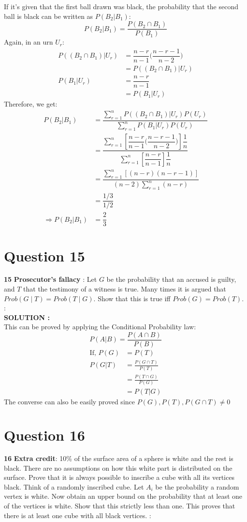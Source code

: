 \documentclass{article}
\begin{document}
If it's given that the first ball drawn was black, the probability that the second ball is black can be written as $P(B_2|B_1)$:
$$P(B_2|B_1) = \frac{P(B_2\cap B_1)}{P(B_1)}$$
Again, in an urn $U_r$:
\begin{align*}
P((B_2\cap B_1)|U_r)&=\dfrac{n-r}{n-1}\Big(\dfrac{n-r-1}{n-2}\Big)\\
&=P((B_2\cap B_1)|U_r)\\
P(B_1|U_r)&=\dfrac{n-r}{n-1}\\
&=P(B_1|U_r)
\end{align*}
Therefore, we get:
\begin{align*}
    P(B_2|B_1)&=\dfrac{\sum^n_{r=1}P((B_2\cap B_1)|U_r)P(U_r)}{\sum^n_{r=1}P(B_1|U_r)P(U_r)}\\
    &=\dfrac{\sum^n_{r=1}\left[\dfrac{n-r}{n-1}\Big(\dfrac{n-r-1}{n-2}\Big)\right]\dfrac{1}{n}}{\sum^n_{r=1}\left[\dfrac{n-r}{n-1}\right]\dfrac{1}{n}}\\
    &=\dfrac{\sum^n_{r=1}\left[(n-r)(n-r-1)\right]}{(n-2)\sum^n_{r=1}(n-r)}\\
    &=\dfrac{1/3}{1/2}\\
  \Rightarrow P(B_2|B_1)&=\dfrac{2}{3}
\end{align*}


\section{Question 15}
\label{Q15}
\textbf{15} \textbf{Prosecutor’s fallacy} : Let $G$ be the probability that an accused is guilty, and $T$ that the testimony of a witness is true. Many times it is argued that $Prob (G \mid T) = Prob (T \mid G)$. Show that this is true iff $Prob (G) = Prob (T).$ : \\ 

\hspace{1em} \large{\textbf{SOLUTION :}} \\
    This can be proved by applying the Conditional Probability law:
    $$P(A|B) = \frac{P(A\cap B)}{P(B)}$$
\begin{align*}
    \text{If, } P(G) &= P(T)\\
    P(G|T)&=\frac{P(G\cap T)}{P(T)}\\
    &=\frac{P(T\cap G)}{P(G)}\\
    &=P(T|G)
\end{align*}
The converse can also be easily proved since  $P(G),P(T),P(G\cap T)\neq0$
\section{Question 16}
\label{Q16}
\textbf{16} \textbf{Extra credit}: 10\% of the surface area of a sphere is white and the rest is black. There are no assumptions on how this white part is distributed on the surface. Prove that it is always possible to inscribe a cube with all its vertices black. Think of a randomly inscribed cube. Let $A_i$ be the probability a random vertex is white. Now obtain an upper bound on the probability that at least one of the vertices is white. Show that this strictly less than one. This proves that there is at least one cube with all black vertices.
 : \\
\end{document}

